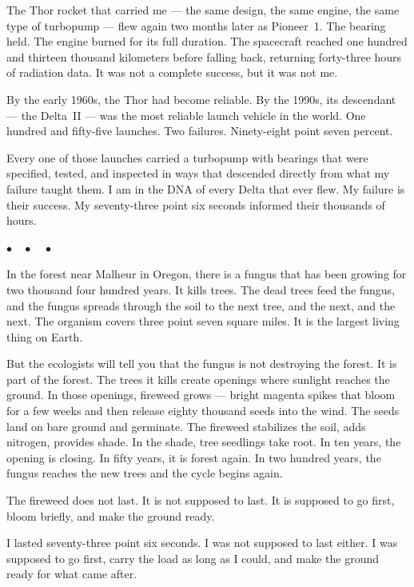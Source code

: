 \documentclass[12pt, letterpaper]{article}
\begin{document}
The Thor rocket that carried me --- the same design, the same engine, the same type of turbopump --- flew again two months later as Pioneer~1. The bearing held. The engine burned for its full duration. The spacecraft reached one hundred and thirteen thousand kilometers before falling back, returning forty-three hours of radiation data. It was not a complete success, but it was not me.

By the early 1960s, the Thor had become reliable. By the 1990s, its descendant --- the Delta~II --- was the most reliable launch vehicle in the world. One hundred and fifty-five launches. Two failures. Ninety-eight point seven percent.

Every one of those launches carried a turbopump with bearings that were specified, tested, and inspected in ways that descended directly from what my failure taught them. I am in the DNA of every Delta that ever flew. My failure is their success. My seventy-three point six seconds informed their thousands of hours.

\begin{center}
$\bullet\quad\bullet\quad\bullet$
\end{center}

In the forest near Malheur in Oregon, there is a fungus that has been growing for two thousand four hundred years. It kills trees. The dead trees feed the fungus, and the fungus spreads through the soil to the next tree, and the next, and the next. The organism covers three point seven square miles. It is the largest living thing on Earth.

But the ecologists will tell you that the fungus is not destroying the forest. It is part of the forest. The trees it kills create openings where sunlight reaches the ground. In those openings, fireweed grows --- bright magenta spikes that bloom for a few weeks and then release eighty thousand seeds into the wind. The seeds land on bare ground and germinate. The fireweed stabilizes the soil, adds nitrogen, provides shade. In the shade, tree seedlings take root. In ten years, the opening is closing. In fifty years, it is forest again. In two hundred years, the fungus reaches the new trees and the cycle begins again.

The fireweed does not last. It is not supposed to last. It is supposed to go first, bloom briefly, and make the ground ready.

I lasted seventy-three point six seconds. I was not supposed to last either. I was supposed to go first, carry the load as long as I could, and make the ground ready for what came after.
\end{document}
